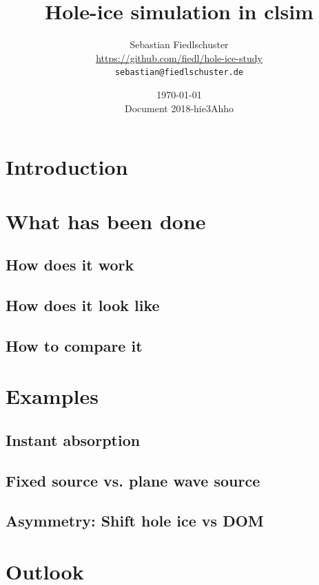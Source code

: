 \documentclass[green, 12pt]{beamer}
\title{Hole-ice simulation in clsim}
\date{\today \\ \vspace*{2mm} \tiny{Document 2018-hie3Ahho}}
\author[Sebastian Fiedlschuster \texttt{<sebastian@fiedlschuster.de>}]{Sebastian Fiedlschuster \\ \tiny{\url{https://github.com/fiedl/hole-ice-study}} \\ \tiny\texttt{sebastian@fiedlschuster.de}}
\institute{Erlangen Centre for Astroparticle Physics}
\newif\ifplacelogo %
\begin{document}



\section{Introduction}
  
  
\placelogofalse

\section{What has been done}
\subsection{How does it work}
  
  
\subsection{How does it look like}
  
\subsection{How to compare it}
  

\section{Examples}
\subsection{Instant absorption}
  
\subsection{Fixed source vs. plane wave source}
  
  
\subsection{Asymmetry: Shift hole ice vs DOM}
  

\section{Outlook}
\end{document}
